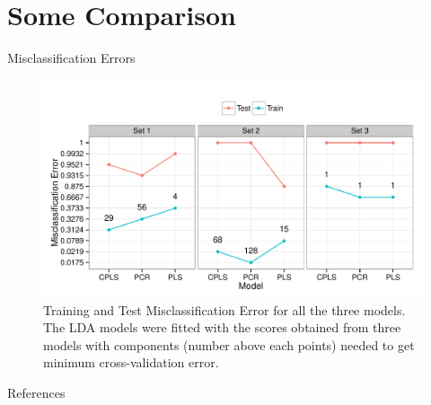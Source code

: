 \documentclass[newPxFont]{beamer}\usepackage[]{graphicx}\usepackage[]{color}
\makeatletter
\def\maxwidth{ %
  \ifdim\Gin@nat@width>\linewidth
    \linewidth
  \else
    \Gin@nat@width
  \fi
}
\newenvironment{knitrout}{}{} %
\makeatother
\begin{document}
\section{Some Comparison}
\begin{frame}[t]{Misclassification Errors}

\begin{knitrout}
\color{fgcolor}\begin{figure}
\includegraphics[width=\maxwidth]{figure/mscErrorPlot-1} \caption[Training and Test Misclassification Error for all the three models]{Training and Test Misclassification Error for all the three models. The LDA models were fitted with the scores obtained from three models with components (number above each points) needed to get minimum cross-validation error.}\label{fig:mscErrorPlot}
\end{figure}


\end{knitrout}
\end{frame}

\begin{frame}[c]{References}
\nocite{indahl2009canonical,R-data.table,wickham2006ggplot,R-knitr,martens2001multivariate,martens1992multivariate,wickham2012reshape2,R-signal}
\printbibliography
\end{frame}
\end{document}
